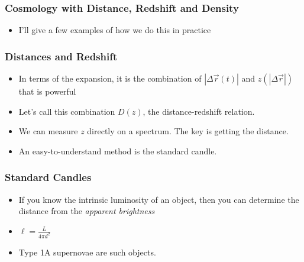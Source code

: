 \documentclass{beamer}
\begin{document}
\frame
{

    \frametitle{Cosmology with Distance, Redshift and Density}


    \begin{itemize}

        \item I'll give a few examples of how we do this in practice


    \end{itemize}

}



\frame
{

    \frametitle{Distances and Redshift}


    \begin{itemize}

        \item In terms of the expansion, it is the combination of {\color{gold}
            $|\Delta \vec{r} (t)| $ } and {\color{gold} $z(|\Delta \vec{r}|)$}
            that is powerful

        \item Let's call this combination  $D(z)$, the distance-redshift
            relation.

        \item We can measure $z$ directly on a spectrum.  The key is getting
            the distance.

        \item An easy-to-understand method is the standard candle.

    \end{itemize}

}

\frame
{

    \frametitle{Standard Candles}


    \begin{itemize}

        \item If you know the intrinsic luminosity of an object, then you can
            determine the distance from the {\em apparent brightness}

        \item {\color{gold} $\ell = \frac{L}{4 \pi d^2}$ }

        \item Type 1A supernovae are such objects.

    \end{itemize}

}
\end{document}
